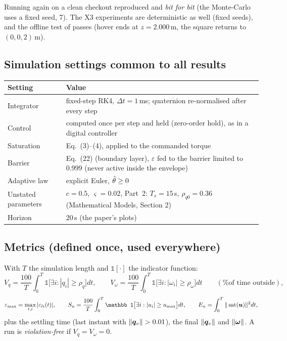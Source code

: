 \begin{projbox}[reproducibility]
Running  again on a clean checkout reproduced  and
 \emph{bit for bit} (the Monte-Carlo uses a fixed seed, 7). The X3 experiments are deterministic as well
(fixed seeds), and the offline test of  passes (hover ends at $z=2.000$\,m, the square returns to
$(0,0,2)$\,m).
\end{projbox}

\subsection{Simulation settings common to all results}

\begin{center}\small
\begin{tabularx}{\linewidth}{@{}l X@{}}
\toprule
\textbf{Setting} & \textbf{Value}\\
\midrule
Integrator & fixed-step RK4, $\Delta t=1$\,ms; quaternion re-normalised after every step\\
Control & computed once per step and held (zero-order hold), as in a digital controller\\
Saturation & Eq.~(3)--(4), applied to the commanded torque\\
Barrier & Eq.~(22) (boundary layer), $\varepsilon$ fed to the barrier limited to 0.999 (never active inside the envelope)\\
Adaptive law & explicit Euler, $\hat{\theta}\ge0$\\
Unstated parameters & $c=0.5$, $\varsigma=0.02$, Part~2: $T_s=15$\,s, $\rho_{q0}=0.36$ (Mathematical Models, Section 2)\\
Horizon & 20\,s (the paper's plots)\\
\bottomrule
\end{tabularx}
\end{center}

\subsection{Metrics (defined once, used everywhere)}
\label{sec:metrics}

With $T$ the simulation length and $\mathbb 1[\cdot]$ the indicator function:
\[
V_q=\frac{100}{T}\int_0^T\mathbb 1\big[\exists i:|q_i|\ge\rho_q\big]dt,\qquad
V_\omega=\frac{100}{T}\int_0^T\mathbb 1\big[\exists i:|\omega_i|\ge\rho_\omega\big]dt\qquad(\text{\% of time outside}),
\]
\[
\varepsilon_{\max}=\max_{t,i}|\varepsilon_{li}(t)|,\qquad
S_u=\frac{100}{T}\int_0^T\mathbb 1\big[\exists i:|u_i|\ge u_{\max}\big]dt,\qquad
E_u=\int_0^T\|\sat(\vu)\|^2dt,
\]
plus the settling time (last instant with $\|\qv\|>0.01$), the final $\|\bm{q}_v\|$ and $\|\bm{\omega}\|$. A run is
\emph{violation-free} if $V_q=V_\omega=0$.
